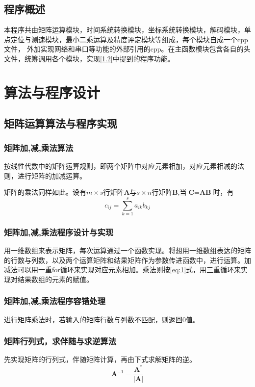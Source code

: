 \documentclass{ctexart}
\begin{document}
\subsection{程序概述}
本程序共由矩阵运算模块，时间系统转换模块，坐标系统转换模块，解码模块，单点定位与测速模块，最小二乘运算及精度评定模块等组成，每个模块自成一个cpp文件，
外加实现网络和串口等功能的外部引用的cpp。在主函数模块包含各自的头文件，统筹调用各个模块，实现\ref{1.2}中提到的程序功能。

\section{算法与程序设计}
\subsection{矩阵运算算法与程序实现}
\subsubsection{矩阵加,减,乘法算法}
按线性代数中的矩阵运算规则，即两个矩阵中对应元素相加，对应元素相减的法则，进行矩阵的加减运算。

矩阵的乘法同样如此。设有$m\times s$行矩阵$\textbf{A}$与$s\times n$行矩阵\textbf{B},当$\textbf{C}=\textbf{A}\textbf{B}$时，有
\begin{equation}
c_{ij}=\sum^s_{k=1}a_{ik}b_{kj}
\label{eq:1}
\end{equation}
\subsubsection{矩阵加,减,乘法程序设计与实现}
用一维数组来表示矩阵，每次运算通过一个函数实现。将想用一维数组表达的矩阵的行数与列数，以及两个运算矩阵和结果矩阵作为参数传进函数中，进行运算。加减法可以用一重for循环来实现对应元素相加。乘法则按\eqref{eq:1}式，用三重循环来实现对结果数组的元素的赋值。
\subsubsection{矩阵加,减,乘法程序容错处理}
进行矩阵乘法时，若输入的矩阵行数与列数不匹配，则返回0值。
\subsubsection{矩阵行列式，求伴随与求逆算法}
先实现矩阵的行列式，伴随矩阵计算，再由下式求解矩阵的逆。
\begin{equation}
\mathbf{A}^{-1}=\frac{\mathbf{A}^*}{\left|\mathbf{A}\right|}
\label{eq:2}
\end{equation}
\end{document}

